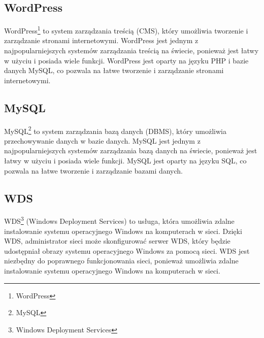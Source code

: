 \subsection{WordPress}

WordPress\footnote{WordPress\cite{WordpressWiki}} to system zarządzania treścią (CMS), który umożliwia tworzenie i zarządzanie stronami internetowymi. WordPress jest jednym z najpopularniejszych systemów zarządzania treścią na świecie, ponieważ jest łatwy w użyciu i posiada wiele funkcji. WordPress jest oparty na języku PHP i bazie danych MySQL, co pozwala na łatwe tworzenie i zarządzanie stronami internetowymi.

\subsection{MySQL}

MySQL\footnote{MySQL\cite{MySQLWiki}} to system zarządzania bazą danych (DBMS), który umożliwia przechowywanie danych w bazie danych. MySQL jest jednym z najpopularniejszych systemów zarządzania bazą danych na świecie, ponieważ jest łatwy w użyciu i posiada wiele funkcji. MySQL jest oparty na języku SQL, co pozwala na łatwe tworzenie i zarządzanie bazami danych.

\subsection{WDS}

WDS\footnote{Windows Deployment Services\cite{WDSwiki}} (Windows Deployment Services) to usługa, która umożliwia zdalne instalowanie systemu operacyjnego Windows na komputerach w sieci. Dzięki WDS, administrator sieci może skonfigurować serwer WDS, który będzie udostępniał obrazy systemu operacyjnego Windows za pomocą sieci. WDS jest niezbędny do poprawnego funkcjonowania sieci, ponieważ umożliwia zdalne instalowanie systemu operacyjnego Windows na komputerach w sieci.



